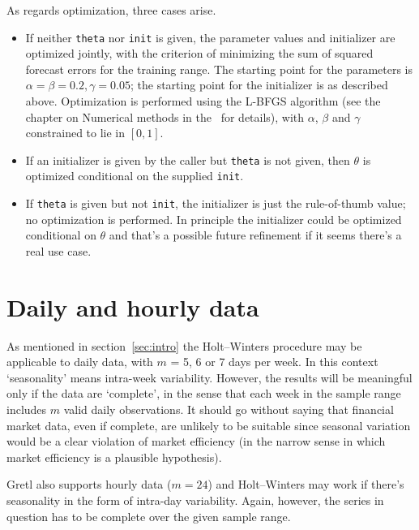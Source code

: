 \documentclass{article}
\begin{document}
As regards optimization, three cases arise.
\begin{itemize}
\item If neither \texttt{theta} nor \texttt{init} is given, the
  parameter values and initializer are optimized jointly, with the
  criterion of minimizing the sum of squared forecast errors for the
  training range. The starting point for the parameters is
  $\alpha = \beta = 0.2, \gamma = 0.05$; the starting point for the
  initializer is as described above. Optimization is performed using the
  L-BFGS algorithm (see the chapter on Numerical methods in the \GUG\
  for details), with $\alpha$, $\beta$ and $\gamma$ constrained to lie
  in $[0,1]$.
\item If an initializer is given by the caller but \texttt{theta} is not
  given, then $\theta$ is optimized conditional on the supplied
  \texttt{init}.
\item If \texttt{theta} is given but not \texttt{init}, the initializer
  is just the rule-of-thumb value; no optimization is performed. In
  principle the initializer could be optimized conditional on $\theta$
  and that's a possible future refinement if it seems there's a real use
  case.
\end{itemize}

\section{Daily and hourly data}
\label{sec:daily}

As mentioned in section~\ref{sec:intro} the Holt--Winters procedure may
be applicable to daily data, with $m$ = 5, 6 or 7 days per
week. In this context `seasonality' means intra-week
variability. However, the results will be meaningful only if the data
are `complete', in the sense that each week in the sample range includes
$m$ valid daily observations. It should go without saying that financial
market data, even if complete, are unlikely to be suitable since
seasonal variation would be a clear violation of market efficiency (in
the narrow sense in which market efficiency is a plausible hypothesis).

Gretl also supports hourly data ($m=24$) and Holt--Winters may work if
there's seasonality in the form of intra-day variability. Again,
however, the series in question has to be complete over the given sample
range.



\end{document}
